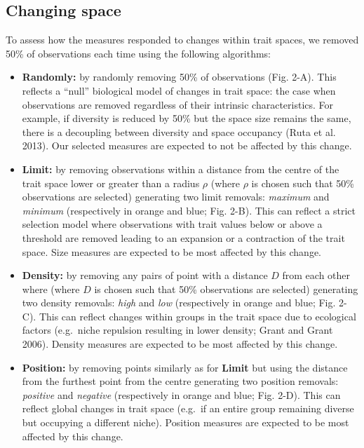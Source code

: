 \documentclass[]{article}
\begin{document}
\subsection{Changing space}\label{changing-spaces}

To assess how the measures responded to changes within trait spaces, we
removed 50\% of observations each time using the following algorithms:

\begin{itemize}
\item
  \textbf{Randomly:} by randomly removing 50\% of observations (Fig.
  2-A). This reflects a ``null'' biological model of changes in trait
  space: the case when observations are removed regardless of their
  intrinsic characteristics. For example, if diversity is reduced by
  50\% but the space size remains the same, there is a decoupling
  between diversity and space occupancy (Ruta et al. 2013). Our selected
  measures are expected to not be affected by this change.
\item
  \textbf{Limit:} by removing observations within a distance from the
  centre of the trait space lower or greater than a radius \(\rho\)
  (where \(\rho\) is chosen such that 50\% observations are selected)
  generating two limit removals: \emph{maximum} and \emph{minimum}
  (respectively in orange and blue; Fig. 2-B). This can reflect a strict
  selection model where observations with trait values below or above a
  threshold are removed leading to an expansion or a contraction of the
  trait space. Size measures are expected to be most affected by this
  change.
\item
  \textbf{Density:} by removing any pairs of point with a distance \(D\)
  from each other where (where \(D\) is chosen such that 50\%
  observations are selected) generating two density removals:
  \emph{high} and \emph{low} (respectively in orange and blue; Fig.
  2-C). This can reflect changes within groups in the trait space due to
  ecological factors (e.g.~niche repulsion resulting in lower density;
  Grant and Grant 2006). Density measures are expected to be most
  affected by this change.
\item
  \textbf{Position:} by removing points similarly as for \textbf{Limit}
  but using the distance from the furthest point from the centre
  generating two position removals: \emph{positive} and \emph{negative}
  (respectively in orange and blue; Fig. 2-D). This can reflect global
  changes in trait space (e.g.~if an entire group remaining diverse but
  occupying a different niche). Position measures are expected to be
  most affected by this change.
\end{itemize}
\end{document}
